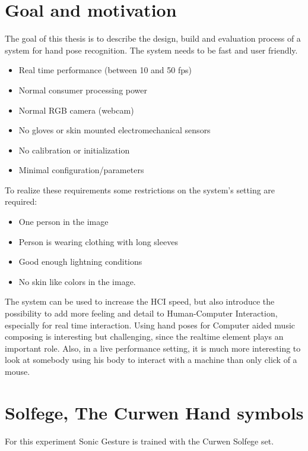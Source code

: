 \section{Goal and motivation}
\label{sec:goal}
The goal of this thesis is to describe the design, build and evaluation process of a system for hand pose recognition. The system needs to be fast and user friendly. 

\begin{itemize}
	\item Real time performance (between 10 and 50 fps)
	\item Normal consumer processing power
	\item Normal RGB camera (webcam)
	\item No gloves or skin mounted electromechanical sensors
	\item No calibration or initialization
	\item Minimal configuration/parameters
\end{itemize}
	

To realize these requirements some restrictions on the system's setting are required:
\begin{itemize}
	\item One person in the image
	\item Person is wearing clothing with long sleeves
	\item Good enough lightning conditions
	\item No skin like colors in the image.
\end{itemize}

The system can be used to increase the HCI speed, but also introduce the possibility to add more feeling and detail to Human-Computer Interaction, especially for real time interaction. Using hand poses for Computer aided music composing is interesting but challenging, since the realtime element plays an important role. Also, in a live performance setting, it is much more interesting to look at somebody using his body to interact with a machine than only click of a mouse.


\section{Solfege, The Curwen Hand symbols}


For this experiment Sonic Gesture is trained with the Curwen Solfege set\cite{choksy1999}.


